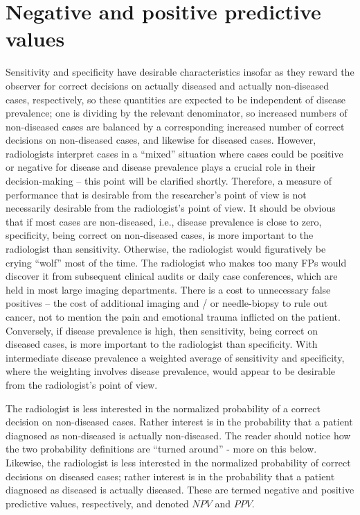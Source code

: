 \documentclass[
]{book}
\begin{document}
\hypertarget{negative-and-positive-predictive-values}{%
\section{Negative and positive predictive values}\label{negative-and-positive-predictive-values}}

Sensitivity and specificity have desirable characteristics insofar as they reward the observer for correct decisions on actually diseased and actually non-diseased cases, respectively, so these quantities are expected to be independent of disease prevalence; one is dividing by the relevant denominator, so increased numbers of non-diseased cases are balanced by a corresponding increased number of correct decisions on non-diseased cases, and likewise for diseased cases. However, radiologists interpret cases in a ``mixed'' situation where cases could be positive or negative for disease and disease prevalence plays a crucial role in their decision-making -- this point will be clarified shortly. Therefore, a measure of performance that is desirable from the researcher's point of view is not necessarily desirable from the radiologist's point of view. It should be obvious that if most cases are non-diseased, i.e., disease prevalence is close to zero, specificity, being correct on non-diseased cases, is more important to the radiologist than sensitivity. Otherwise, the radiologist would figuratively be crying ``wolf'' most of the time. The radiologist who makes too many FPs would discover it from subsequent clinical audits or daily case conferences, which are held in most large imaging departments. There is a cost to unnecessary false positives -- the cost of additional imaging and / or needle-biopsy to rule out cancer, not to mention the pain and emotional trauma inflicted on the patient. Conversely, if disease prevalence is high, then sensitivity, being correct on diseased cases, is more important to the radiologist than specificity. With intermediate disease prevalence a weighted average of sensitivity and specificity, where the weighting involves disease prevalence, would appear to be desirable from the radiologist's point of view.

The radiologist is less interested in the normalized probability of a correct decision on non-diseased cases. Rather interest is in the probability that a patient diagnosed as non-diseased is actually non-diseased. The reader should notice how the two probability definitions are ``turned around'' - more on this below. Likewise, the radiologist is less interested in the normalized probability of correct decisions on diseased cases; rather interest is in the probability that a patient diagnosed as diseased is actually diseased. These are termed negative and positive predictive values, respectively, and denoted \(NPV\) and \(PPV\).
\end{document}
